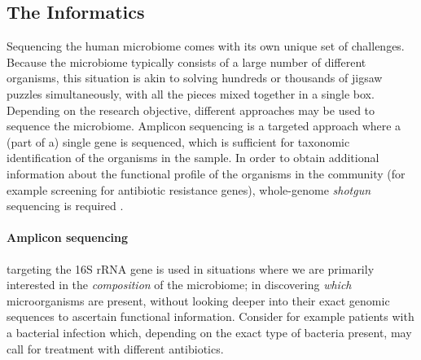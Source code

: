 \begin{justify}

\subsection{The Informatics}

Sequencing the human microbiome comes with its own unique set of challenges. Because the microbiome typically consists of a large number of different organisms, this situation is akin to solving hundreds or thousands of jigsaw puzzles simultaneously, with all the pieces mixed together in a single box. Depending on the research objective, different approaches may be used to sequence the microbiome. Amplicon sequencing is a targeted approach where a (part of a) single gene is sequenced, which is sufficient for taxonomic identification of the organisms in the sample. In order to obtain additional information about the functional profile of the organisms in the community (for example screening for antibiotic resistance genes), whole-genome \emph{shotgun} sequencing is required \cite{ranjan2016analysis}.

\paragraph{Amplicon sequencing} targeting the 16S rRNA gene is used in situations where we are primarily interested in the \emph{composition} of the microbiome; in discovering \emph{which} microorganisms are present, without looking deeper into their exact genomic sequences to ascertain functional information. Consider for example patients with a bacterial infection which, depending on the exact type of bacteria present, may call for treatment with different antibiotics.


\end{justify}
